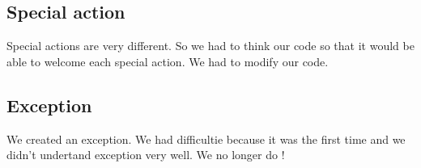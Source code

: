 \subsection{Special action}

Special actions are very different. So we had to think our code so that it would be able to welcome each special action.
We had to modify our code.

\subsection{Exception}

We created an exception. We had difficultie because it was the first time and we didn't undertand exception very well.
We no longer do !


